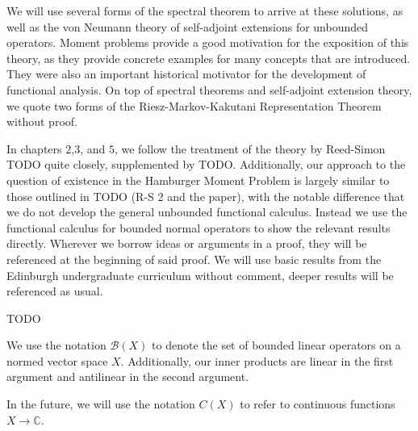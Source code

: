 \documentclass[12pt,oneside]{report}
\begin{document}
We will use several forms of the spectral theorem to arrive at these solutions, as well as the von Neumann theory of self-adjoint extensions for unbounded operators. Moment problems provide a good motivation for the exposition of this theory, as they provide concrete examples for many concepts that are introduced. They were also an important historical motivator for the development of functional analysis. On top of spectral theorems and self-adjoint extension theory, we quote two forms of the Riesz-Markov-Kakutani Representation Theorem without proof.

In chapters $2$,$3$, and $5$, we follow the treatment of the theory by Reed-Simon TODO quite closely, supplemented by TODO. Additionally, our approach to the question of existence in the Hamburger Moment Problem is largely similar to those outlined in TODO (R-S 2 and the paper), with the notable difference that we do not develop the general unbounded functional calculus. Instead we use the functional calculus for bounded normal operators to show the relevant results directly. Wherever we borrow ideas or arguments in a proof, they will be referenced at the beginning of said proof. We will use basic results from the Edinburgh undergraduate curriculum without comment, deeper results will be referenced as usual.

TODO

We use the notation $\mathscr{B}(X)$ to denote the set of bounded linear operators on a normed vector space $X$. Additionally, our inner products are linear in the first argument and antilinear in the second argument.

In the future, we will use the notation $C(X)$ to refer to continuous functions $X \to \mathbb{C}$.


\end{document}

